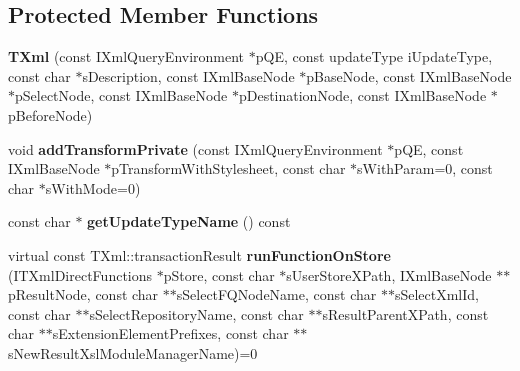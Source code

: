 \subsection*{\-Protected \-Member \-Functions}
\begin{DoxyCompactItemize}
\item 
\hypertarget{classgeneral__server_1_1TXml_a79da427a0f39650bd9d0da719c4d366f}{{\bfseries \-T\-Xml} (const \-I\-Xml\-Query\-Environment $\ast$p\-Q\-E, const update\-Type i\-Update\-Type, const char $\ast$s\-Description, const \-I\-Xml\-Base\-Node $\ast$p\-Base\-Node, const \-I\-Xml\-Base\-Node $\ast$p\-Select\-Node, const \-I\-Xml\-Base\-Node $\ast$p\-Destination\-Node, const \-I\-Xml\-Base\-Node $\ast$p\-Before\-Node)}\label{classgeneral__server_1_1TXml_a79da427a0f39650bd9d0da719c4d366f}

\item 
\hypertarget{classgeneral__server_1_1TXml_adcf0d7a6b74eff444fbbb1429d7de850}{void {\bfseries add\-Transform\-Private} (const \-I\-Xml\-Query\-Environment $\ast$p\-Q\-E, const \-I\-Xml\-Base\-Node $\ast$p\-Transform\-With\-Stylesheet, const char $\ast$s\-With\-Param=0, const char $\ast$s\-With\-Mode=0)}\label{classgeneral__server_1_1TXml_adcf0d7a6b74eff444fbbb1429d7de850}

\item 
\hypertarget{classgeneral__server_1_1TXml_a09ca8b81c73c27edde08b36b976b3313}{const char $\ast$ {\bfseries get\-Update\-Type\-Name} () const }\label{classgeneral__server_1_1TXml_a09ca8b81c73c27edde08b36b976b3313}

\item 
\hypertarget{classgeneral__server_1_1TXml_ac69baabeae705bba6a94810c7597b4fc}{virtual const \*
\-T\-Xml\-::transaction\-Result {\bfseries run\-Function\-On\-Store} (\-I\-T\-Xml\-Direct\-Functions $\ast$p\-Store, const char $\ast$s\-User\-Store\-X\-Path, \-I\-Xml\-Base\-Node $\ast$$\ast$p\-Result\-Node, const char $\ast$$\ast$s\-Select\-F\-Q\-Node\-Name, const char $\ast$$\ast$s\-Select\-Xml\-Id, const char $\ast$$\ast$s\-Select\-Repository\-Name, const char $\ast$$\ast$s\-Result\-Parent\-X\-Path, const char $\ast$$\ast$s\-Extension\-Element\-Prefixes, const char $\ast$$\ast$s\-New\-Result\-Xsl\-Module\-Manager\-Name)=0}\label{classgeneral__server_1_1TXml_ac69baabeae705bba6a94810c7597b4fc}

\end{DoxyCompactItemize}
